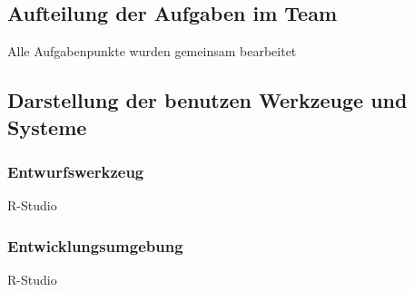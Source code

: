 \subsection*{Aufteilung der Aufgaben im Team}
Alle Aufgabenpunkte wurden gemeinsam bearbeitet
\subsection*{Darstellung der benutzen Werkzeuge und Systeme}
\subsubsection*{Entwurfswerkzeug}
R-Studio
\subsubsection*{Entwicklungsumgebung}
R-Studio

